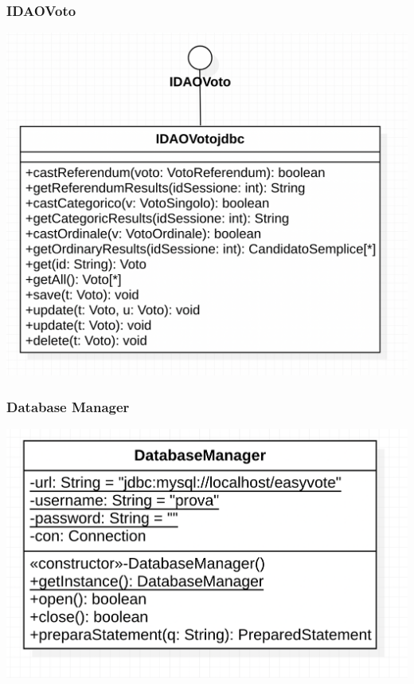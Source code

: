 \documentclass[11pt, oneside]{article}   	%
\begin{document}
\subsubsection{IDAOVoto}
\begin{center}
\includegraphics[scale=0.7]{images/class8.png}
\end{center}

\pagebreak

\subsubsection{Database Manager}
\begin{center}
\includegraphics[scale=0.7]{images/class9.png}
\end{center}
\pagebreak
\end{document}
